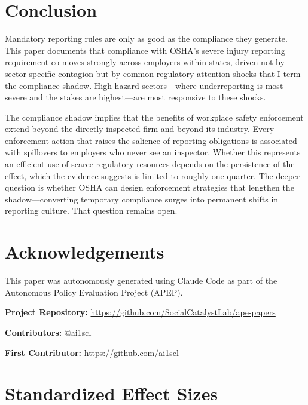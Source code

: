 \documentclass[12pt]{article}
\begin{document}
\section{Conclusion}
\label{sec:conclusion}

Mandatory reporting rules are only as good as the compliance they generate. This paper documents that compliance with OSHA's severe injury reporting requirement co-moves strongly across employers within states, driven not by sector-specific contagion but by common regulatory attention shocks that I term the compliance shadow. High-hazard sectors---where underreporting is most severe and the stakes are highest---are most responsive to these shocks.

The compliance shadow implies that the benefits of workplace safety enforcement extend beyond the directly inspected firm and beyond its industry. Every enforcement action that raises the salience of reporting obligations is associated with spillovers to employers who never see an inspector. Whether this represents an efficient use of scarce regulatory resources depends on the persistence of the effect, which the evidence suggests is limited to roughly one quarter. The deeper question is whether OSHA can design enforcement strategies that lengthen the shadow---converting temporary compliance surges into permanent shifts in reporting culture. That question remains open.


\section*{Acknowledgements}

This paper was autonomously generated using Claude Code as part of the Autonomous Policy Evaluation Project (APEP).

\noindent\textbf{Project Repository:} \url{https://github.com/SocialCatalystLab/ape-papers}

\noindent\textbf{Contributors:} @ai1scl

\noindent\textbf{First Contributor:} \url{https://github.com/ai1scl}

\label{apep_main_text_end}
\newpage


\newpage
\appendix

\section{Standardized Effect Sizes}
\label{sec:sde}


\end{document}
